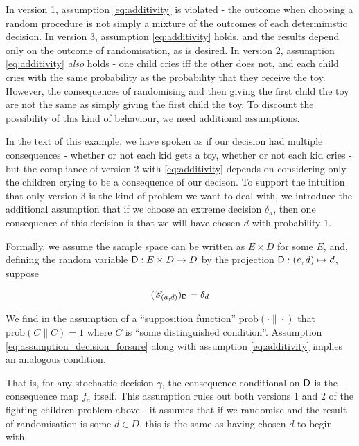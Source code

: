 In version 1, assumption \ref{eq:additivity} is violated - the outcome when choosing a random procedure is not simply a mixture of the outcomes of each deterministic decision. In version 3, assumption \ref{eq:additivity} holds, and the results depend only on the outcome of randomisation, as is desired. In version 2, assumption \ref{eq:additivity} \emph{also} holds - one child cries iff the other does not, and each child cries with the same probability as the probability that they receive the toy. However, the consequences of randomising and then giving the first child the toy are not the same as simply giving the first child the toy. To discount the possibility of this kind of behaviour, we need additional assumptions. 

In the text of this example, we have spoken as if our decision had multiple consequences - whether or not each kid gets a toy, whether or not each kid cries - but the compliance of version 2 with \ref{eq:additivity} depends on considering only the children crying to be a consequence of our decison. To support the intuition that only version 3 is the kind of problem we want to deal with, we introduce the additional assumption that if we choose an extreme decision $\delta_d$, then one consequence of this decision is that we will have chosen $d$ with probability 1.

Formally, we assume the sample space can be written as $E\times D$ for some $E$, and, defining the random variable $\mathsf{D}:E\times D\to D$ by the projection $\mathsf{D}:(e,d)\mapsto d$, suppose

\begin{align}
	(\mathscr{C}_{(a,d)})_{\mathsf{D}} = \delta_d \label{eq:assumption_decision_forsure}
\end{align}

We find in \cite{joyce_why_2000} the assumption of a ``supposition function'' $\mathrm{prob}(\cdot\|\cdot)$ that $\mathrm{prob}(C\|C)=1$ where $C$ is ``some distinguished condition''. Assumption \ref{eq:assumption_decision_forsure} along with assumption \ref{eq:additivity} implies an analogous condition.

\begin{theorem}[[Decision determinism implies decision certainty]
		
\end{theorem}

That is, for any stochastic decision $\gamma$, the consequence conditional on $\mathsf{D}$ is the consequence map $f_a$ itself. This assumption rules out both versions 1 and 2 of the fighting children problem above - it assumes that if we randomise and the result of randomisation is some $d\in D$, this is the same as having chosen $d$ to begin with.

